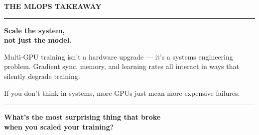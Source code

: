 \documentclass[11pt]{article}
\begin{document}
\vfill
\newpage


\vspace*{0.35in}

\begin{center}

{\fontsize{14}{16}\selectfont\color{brandblue}\textbf{THE MLOPS TAKEAWAY}}

\vspace{0.3in}

\begin{minipage}{0.88\textwidth}
\centering

{\color{brandblue}\rule{6cm}{1pt}}

\vspace{0.2in}

{\fontsize{24}{28}\selectfont\bfseries\color{brandnavy}
Scale the system,\\
not just the model.
}

\vspace{0.15in}

{\fontsize{12}{14}\selectfont\color{brandgray}
Multi-GPU training isn't a hardware upgrade — it's a systems engineering problem. Gradient sync, memory, and learning rates all interact in ways that silently degrade training.

\vspace{0.1in}
If you don't think in systems, more GPUs just mean more expensive failures.
}

\vspace{0.2in}

{\color{brandblue}\rule{6cm}{1pt}}

\vspace{0.3in}

{\fontsize{14}{16}\selectfont\bfseries\color{brandnavy}
What's the most surprising thing that broke\\
when you scaled your training?
}

\end{minipage}

\end{center}

\vfill
\end{document}
